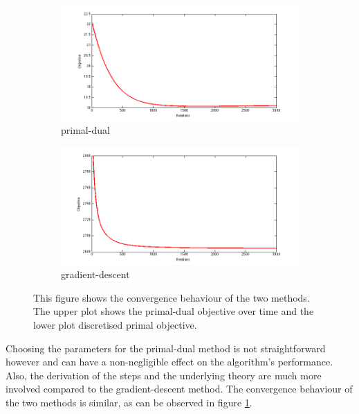 \documentclass{paper}
\begin{document}
\begin{enumerate}
\begin{figure}[t]
\begin{center}
\begin{subfigure}[b]{1\textwidth}
                \includegraphics[width=\textwidth]{objective}
                \caption{primal-dual}
        \end{subfigure}
        	\begin{subfigure}[b]{1\textwidth}
                \includegraphics[width=\textwidth]{objGD}
                \caption{gradient-descent}
        \end{subfigure}
\end{center}
\caption{This figure shows the convergence behaviour of the two methods. The upper plot shows the primal-dual objective over time and the lower plot discretised primal objective.}
\label{fig:conv}
\end{figure}

Choosing the parameters for the primal-dual method is not straightforward however and can have a non-negligible effect on the algorithm's performance. Also, the derivation of the steps and the underlying theory are much more involved compared to the gradient-descent method. The convergence behaviour of the two methods is similar, as can be observed in figure \ref{fig:conv}.




\end{enumerate}

 
\end{document}
